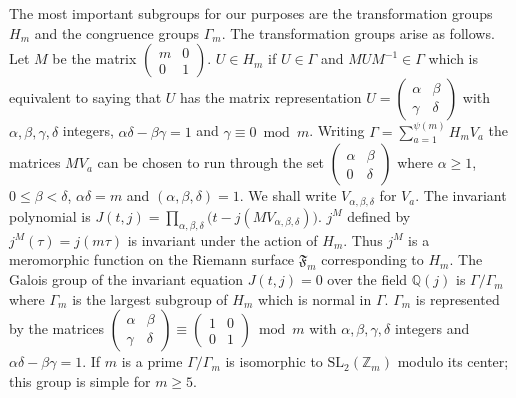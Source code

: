 The most important subgroups for our purposes are the transformation
groups $H_{m}$ and the congruence groups $\Gamma_{m}$. The transformation
groups arise as follows. Let $M$ be the matrix
$\begin{pmatrix}m&0\\ 0&1\end{pmatrix}$. $U\in H_{m}$ if $U\in\Gamma$ and
$MUM^{-1}\in\Gamma$ which is equivalent to saying that $U$ has the matrix
representation $U=\begin{pmatrix}\alpha&\beta\\ \gamma&\delta\end{pmatrix}$
with $\alpha,\beta,\gamma,\delta$ integers, $\alpha\delta-\beta\gamma=1$
and $\gamma\equiv 0\bmod m$. Writing
$\Gamma=\sum_{a=1}^{\psi(m)}H_{m}V_{a}$ the matrices $MV_{a}$ can be
chosen to run through the set
$\begin{pmatrix}\alpha&\beta\\ 0&\delta\end{pmatrix}$ where
$\alpha\geq 1$, $0\leq\beta<\delta$, $\alpha\delta=m$ and
$(\alpha,\beta,\delta)=1$. We shall write $V_{\alpha,\beta,\delta}$ for
$V_{a}$. The invariant polynomial is
$J(t,j)=\prod_{\alpha,\beta,\delta}\bigl(t-j(MV_{\alpha,\beta,\delta})
\bigr)$. $j^{M}$ defined by $j^{M}(\tau)=j(m\tau)$ is invariant under the
action of $H_{m}$. Thus $j^{M}$ is a meromorphic function on the Riemann
surface $\mathfrak{F}_{m}$ corresponding to $H_{m}$. The Galois group of
the invariant equation $J(t,j)=0$ over the field $\mathbb{Q}(j)$ is
$\Gamma/\Gamma_{m}$ where $\Gamma_{m}$ is the largest subgroup of $H_{m}$
which is normal in $\Gamma$. $\Gamma_{m}$ is represented by the matrices
$\begin{pmatrix}\alpha&\beta\\ \gamma&\delta\end{pmatrix}\equiv
\begin{pmatrix}1&0\\ 0&1\end{pmatrix}\bmod m$ with $\alpha,\beta,\gamma,
\delta$ integers and $\alpha\delta-\beta\gamma=1$. If $m$ is a prime
$\Gamma/\Gamma_{m}$ is isomorphic to $\mathrm{SL}_{2}(\mathbb{Z}_{m})$
modulo its center; this group is simple for $m\geq 5$.

